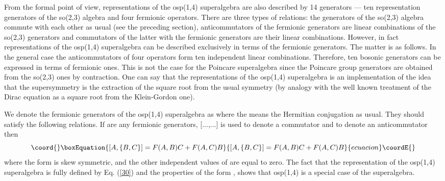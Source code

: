 \documentclass[a4paper,12pt]{article}%
\begin{document}
From the formal point of view, representations of the osp(1,4) 
superalgebra are also described by 14 generators --- ten 
representation generators of the so(2,3) algebra and four 
fermionic operators. There are three types of 
relations: the generators
of the so(2,3) algebra commute with each other as usual 
(see the preceding section), anticommutators of the 
fermionic generators are linear combinations of the so(2,3) 
generators and commutators of the latter with
the fermionic generators are their linear combinations. 
However, in fact representations of the osp(1,4) 
superalgebra can be described exclusively
in terms of the fermionic generators. The matter is 
as follows. In the general case the anticommutators of four 
operators form ten independent linear combinations. 
Therefore, ten bosonic generators can be expressed
in terms of fermionic ones. This is not the case for the 
Poincare superalgebra since the Poincare group generators 
are obtained from the so(2,3) ones by contraction. One can 
say that the representations of the
osp(1,4) superalgebra is an implementation of the idea that 
the supersymmetry
is the extraction of the square root from the usual 
symmetry (by
analogy with the well known treatment of the Dirac equation 
as a square
root from the Klein-Gordon one).

We denote the fermionic generators of the osp(1,4) superalgebra
as \coordHE{} where the \myHighlight{$^*$}\coordHE{} means the 
Hermitian conjugation as 
usual. They should satisfy the following relations. 
If \coordHE{} are any
fermionic generators, [...,...] is used to denote 
a commutator and
\coordHE{} to denote an anticommutator then   
\begin{equation}\coord{}\boxEquation{
[A,\{ B,C\} ]=F(A,B)C + F(A,C)B
\label{30}
}{
[A,\{ B,C\} ]=F(A,B)C + F(A,C)B
}{ecuacion}\coordE{}\end{equation}
where the form \coordHE{} is skew symmetric, \coordHE{} 
\coordHE{} and
the other independent values of \coordHE{} are equal to zero.
The fact that the representation of the osp(1,4) superalgebra 
is fully defined by Eq. (\ref{30}) and the properties of the form
\coordHE{}, shows that osp(1,4) is a special case of the
superalgebra.  
\end{document}
